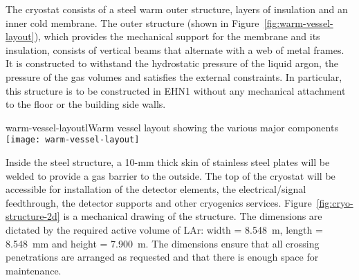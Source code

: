 The cryostat consists of a steel warm outer structure, layers of insulation and an inner cold membrane.  The outer %
structure (shown in Figure~\ref{fig:warm-vessel-layout}), which provides %
the mechanical support for the  %
membrane and its insulation,  consists of vertical beams that alternate with a web of metal frames. It is constructed to %
withstand the hydrostatic pressure of the liquid argon, the pressure of the gas volumes and %
satisfies the external constraints. %
In particular, this structure is to be constructed in EHN1 without any mechanical attachment to the floor or the building side walls.  
%
\begin{cdrfigure}{warm-vessel-layout}{lWarm vessel layout showing the various major components}
  \texttt{[image: warm-vessel-layout]}
\end{cdrfigure}
%
Inside the steel structure, a 10-mm thick skin of stainless steel plates will be welded to provide a gas barrier to the outside.
The top of the cryostat will be accessible for installation of the detector elements, the electrical/signal feedthrough, the detector supports and other cryogenics services.  Figure~\ref{fig:cryo-structure-2d} is a mechanical drawing of the structure. The dimensions %
are dictated by the required %
active volume of LAr:  %
width = 8.548~m, length = 8.548~mm and height = 7.900~m. The dimensions  %
ensure that all crossing penetrations are arranged as requested and that there is enough space for maintenance.  

